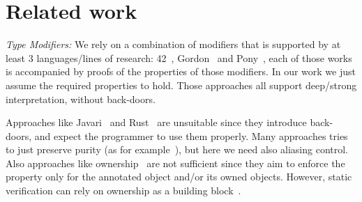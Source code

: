 
\saveSpace
\section{Related work}
\label{s:related}
\saveSpace

\noindent\textit{Type Modifiers:}
We rely on a combination of modifiers that is supported by at least 3 languages/lines of research:
42~\cite{ServettoZucca15,ServettoEtAl13a,JOT:issue_2011_01/article1,GianniniEtAl16},
Gordon~\cite{GordonEtAl12}
and Pony~\cite{clebsch2015deny,clebsch2017orca},
each of those works is accompanied by proofs of the properties of those modifiers.
In our work we just assume the required properties to hold.
 Those approaches all support deep/strong interpretation, without back-doors.

Approaches like Javari~\cite{TschantzErnst05,Boyland06} and Rust~\cite{matsakis2014rust}
are unsuitable since they introduce back-doors, and expect the programmer to use them properly.
Many approaches tries to just preserve purity (as for example~\cite{pearce2011jpure}),
but here we need also aliasing control.
Also approaches like ownership~\cite{ClarkeEtAl13,ZibinEtAl10,DietlEtAl07}
are not sufficient since they aim to enforce the property only for
the annotated object and/or its owned objects.
However, static verification can rely on ownership as a building block~\cite{%
muller2002modular,%
barnett2011specification%
}.%





